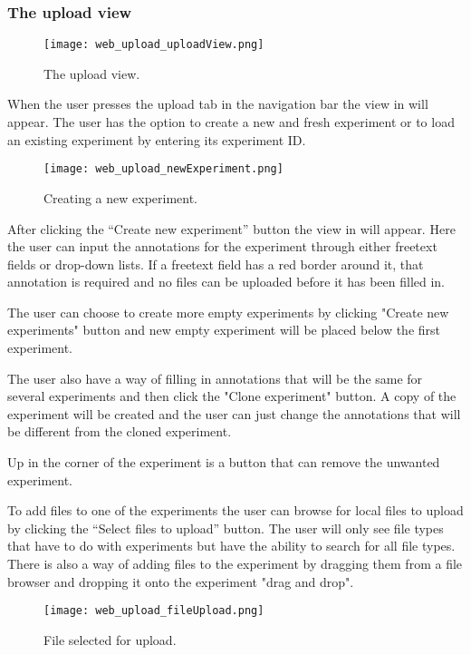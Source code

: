 \subsubsection{The upload view}
\begin{figure}[h]
\centering
\texttt{[image: web\_upload\_uploadView.png]}
\caption{\label{fig:web_upload_uploadView}The upload view.}
\end{figure}

When the user presses the upload tab in the navigation bar the view in  will appear. The user has the option to create a new and fresh experiment or to load an existing experiment by entering its experiment ID. 
\begin{figure}[h]
\centering
\texttt{[image: web\_upload\_newExperiment.png]}
\caption{\label{fig:web_upload_newExperiment}Creating a new experiment.}
\end{figure}

After clicking the “Create new experiment” button the view in  will appear. Here the user can input the annotations for the experiment through either freetext fields or drop-down lists. If a freetext field has a red border around it, that annotation is required and no files can be uploaded before it has been filled in.

The user can choose to create more empty experiments by clicking "Create new experiments" button and new empty experiment will be placed below the first experiment.

The user also have a way of filling in annotations that will be the same for several experiments and then click the "Clone experiment" button. A copy of the experiment will be created and the user can just change the annotations that will be different from the cloned experiment.

Up in the corner of the experiment is a button that can remove the unwanted experiment. 

To add files to one of the experiments the user can browse for local files to upload by clicking the “Select files to upload” button. The user will only see file types that have to do with experiments but have the ability to search for all file types. There is also a way of adding files to the experiment by dragging them from a file browser and dropping it onto the experiment "drag and drop".
\begin{figure}[h]
\centering
\texttt{[image: web\_upload\_fileUpload.png]}
\caption{\label{fig:web_upload_fileUpload}File selected for upload.}
\end{figure}
 
